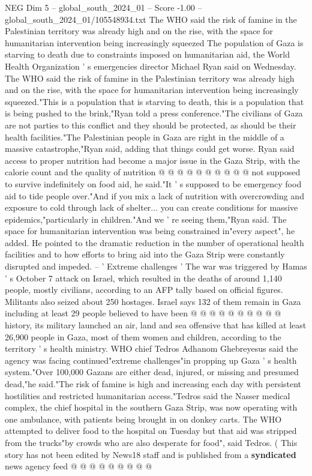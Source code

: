\begin{textsample}{NEG Dim 5 – global\_south\_2024\_01 – Score -1.00 – global\_south\_2024\_01/105548934.txt}  \label{ex:f5_neg_433}
The WHO said the risk of famine in the Palestinian territory was already high and on the rise, with the space for humanitarian intervention being increasingly squeezed The population of Gaza is starving to death due to constraints imposed on humanitarian aid, the World Health Organization ' s emergencies director Michael Ryan said on Wednesday.
The WHO said the risk of famine in the Palestinian territory was already high and on the rise, with the space for humanitarian intervention being increasingly squeezed."This is a population that is starving to death, this is a population that is being pushed to the brink,"Ryan told a press conference."The civilians of Gaza are not parties to this conflict and they should be protected, as should be their health facilities."The Palestinian people in Gaza are right in the middle of a massive catastrophe,"Ryan said, adding that things could get worse.
Ryan said access to proper nutrition had become a major issue in the Gaza Strip, with the calorie count and the quality of nutrition @ @ @ @ @ @ @ @ @ @ not supposed to survive indefinitely on food aid, he said."It ' s supposed to be emergency food aid to tide people over."And if you mix a lack of nutrition with overcrowding and exposure to cold through lack of shelter... you can create conditions for massive epidemics,"particularly in children."And we ' re seeing them,"Ryan said.
The space for humanitarian intervention was being constrained in"every aspect", he added.
He pointed to the dramatic reduction in the number of operational health facilities and to how efforts to bring aid into the Gaza Strip were constantly disrupted and impeded. -- ' Extreme challenges ' The war was triggered by Hamas ' s October 7 attack on Israel, which resulted in the deaths of around 1,140 people, mostly civilians, according to an AFP tally based on official figures.
Militants also seized about 250 hostages.
Israel says 132 of them remain in Gaza including at least 29 people believed to have been @ @ @ @ @ @ @ @ @ @ history, its military launched an air, land and sea offensive that has killed at least 26,900 people in Gaza, most of them women and children, according to the territory ' s health ministry.
WHO chief Tedros Adhanom Ghebreyesus said the agency was facing continued"extreme challenges"in propping up Gaza ' s health system."Over 100,000 Gazans are either dead, injured, or missing and presumed dead,"he said."The risk of famine is high and increasing each day with persistent hostilities and restricted humanitarian access."Tedros said the Nasser medical complex, the chief hospital in the southern Gaza Strip, was now operating with one ambulance, with patients being brought in on donkey carts.
The WHO attempted to deliver food to the hospital on Tuesday but that aid was stripped from the trucks"by crowds who are also desperate for food", said Tedros. ( This story has not been edited by News18 staff and is published from a \textbf{syndicated} news agency feed @ @ @ @ @ @ @ @ @

\end{textsample}
